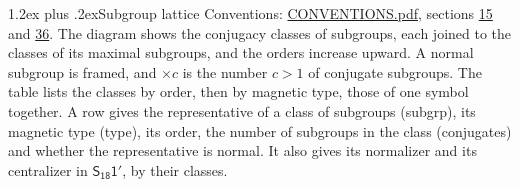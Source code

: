 \documentclass[10pt,a4paper]{article}
\makeatletter
\renewcommand\section{\@startsection{section}{1}{\z@}{-3ex plus -1ex minus -.2ex}%
  {1.2ex plus .2ex}{\normalfont\large\sffamily\bfseries\color{parttitle}}}
\numberwithin{equation}{section}
\newcommand{\grp}[1]{\mathsf{#1}}
\makeatother
\begin{document}
\section{Subgroup lattice}\label{s:subgroups}
Conventions: \href{../../CONVENTIONS.pdf}{CONVENTIONS.pdf}, sections \href{../../../rotation/CONVENTIONS.pdf\#conv.15}{15} and \href{../../CONVENTIONS.pdf\#conv.36}{36}.
The diagram shows the conjugacy classes of subgroups, each joined to the classes of its maximal subgroups, and the orders increase upward. \label{n:index.conjugates.c}A normal subgroup is framed, and ${\times}c$ is the number $c > 1$ of conjugate subgroups. The table lists the classes by order, then by magnetic type, those of one symbol together. \label{n:head.subgroup}\label{n:head.magnetic.type}\label{n:head.order}\label{n:head.conjugates}\label{n:head.normal}A row gives the representative of a class of subgroups (subgrp), its magnetic type (type), its order, the number of subgroups in the class (conjugates) and whether the representative is normal. \label{n:head.normalizer}\label{n:head.centralizer}It also gives its normalizer and its centralizer in $\grp{S_{18}1'}$, by their classes. 
\end{document}
